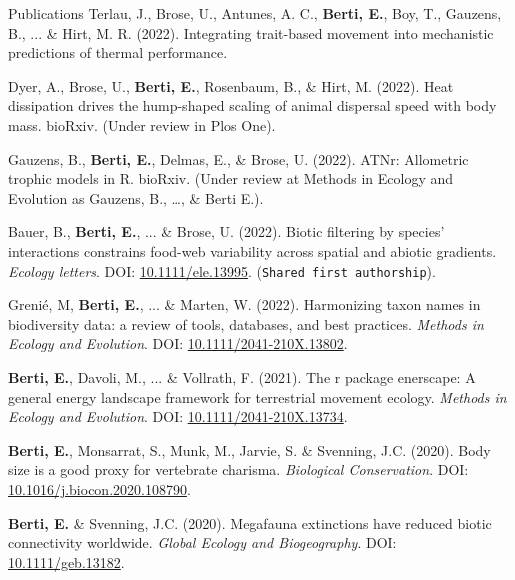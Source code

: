 \documentclass{resume} %
\begin{document}
\begin{rSection}{Publications}
Terlau, J., Brose, U., Antunes, A. C., \textbf{Berti, E.}, Boy, T., Gauzens, B., ... \& Hirt, M. R. (2022). Integrating trait-based movement into mechanistic predictions of thermal performance.

Dyer, A., Brose, U., \textbf{Berti, E.}, Rosenbaum, B., \& Hirt, M. (2022). Heat dissipation drives the hump-shaped scaling of animal dispersal speed with body mass. bioRxiv. (Under review in Plos One).

Gauzens, B., \textbf{Berti, E.}, Delmas, E., \& Brose, U. (2022). ATNr: Allometric trophic models in R. bioRxiv. (Under review at Methods in Ecology and Evolution as Gauzens, B., \dots, \& Berti E.).

Bauer, B., \textbf{Berti, E.}, ... \& Brose, U. (2022). Biotic filtering by species’ interactions constrains food-web variability across spatial and abiotic gradients. \textit{Ecology letters}. DOI: \href{https://doi.org/10.1111/ele.13995}{10.1111/ele.13995}. (\texttt{Shared first authorship}).

Grenié, M, \textbf{Berti, E.}, ... \& Marten, W. (2022). Harmonizing taxon names in biodiversity data: a review of tools, databases, and best practices. \textit{Methods in Ecology and Evolution}. DOI: \href{https://doi.org/10.1111/2041-210X.13802}{10.1111/2041-210X.13802}.

\textbf{Berti, E.}, Davoli, M., ... \& Vollrath, F. (2021). The r package enerscape: A general energy landscape framework for terrestrial movement ecology. \textit{Methods in Ecology and Evolution}. DOI: \href{https://doi.org/10.1111/2041-210X.13734}{10.1111/2041-210X.13734}.

\textbf{Berti, E.}, Monsarrat, S., Munk, M., Jarvie, S. \& Svenning, J.C. (2020). Body size is a good proxy for vertebrate charisma. \textit{Biological Conservation}. DOI: \href{https://doi.org/10.1016/j.biocon.2020.108790}{10.1016/j.biocon.2020.108790}.

\textbf{Berti, E.} \& Svenning, J.C. (2020). Megafauna extinctions have reduced biotic connectivity worldwide. \textit{Global Ecology and Biogeography}. DOI: \href{https://doi.org/10.1111/geb.13182}{10.1111/geb.13182}.
\end{rSection}
\end{document}
